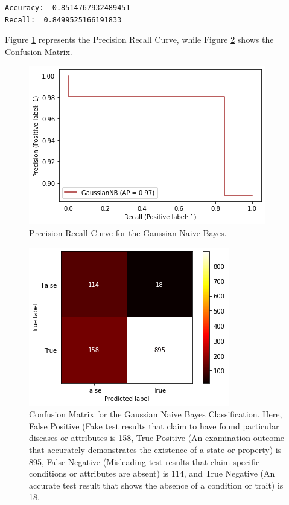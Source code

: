 \documentclass[sn-basic]{sn-jnl}%
\theoremstyle{thmstyleone}%
\theoremstyle{thmstyletwo}%
\theoremstyle{thmstylethree}%
\begin{document}
\begin{enumerate}
\begin{verbatim}
Accuracy:  0.8514767932489451
Recall:  0.8499525166191833
\end{verbatim}
Figure \ref{Fig. 8} represents the Precision Recall Curve, while Figure \ref{Fig. 9} shows the Confusion Matrix. 
\begin{figure}[!h]
\centering
\includegraphics[width=\textwidth]{PRC_GNB}
\caption{Precision Recall Curve for the Gaussian Naive Bayes. }
\label{Fig. 8}
\end{figure}
\begin{figure}[!h]
\centering
\includegraphics[width=\textwidth]{CM_GNB}
\caption{Confusion Matrix for the Gaussian Naive Bayes Classification. Here, False Positive (Fake test results that claim to have found particular diseases or attributes is 158, True Positive (An examination outcome that accurately demonstrates the existence of a state or property) is 895, False Negative (Misleading test results that claim specific conditions
or attributes are absent) is 114, and True Negative (An accurate test result that shows the absence of a condition or trait) is 18.}
\label{Fig. 9}
\end{figure}
\end{enumerate}

\end{document}
